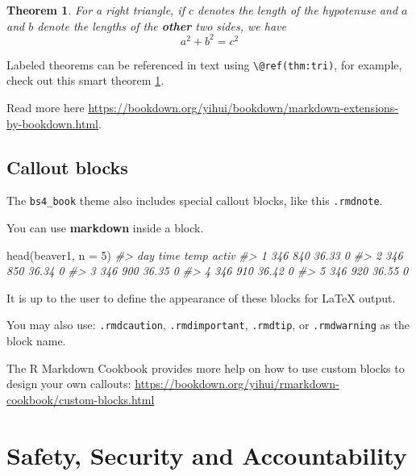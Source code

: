 \documentclass[
]{book}
\newenvironment{Shaded}{\begin{snugshade}}{\end{snugshade}}
\newcommand{\AttributeTok}[1]{\textcolor[rgb]{0.77,0.63,0.00}{#1}}
\newcommand{\CommentTok}[1]{\textcolor[rgb]{0.56,0.35,0.01}{\textit{#1}}}
\newcommand{\DecValTok}[1]{\textcolor[rgb]{0.00,0.00,0.81}{#1}}
\newcommand{\FunctionTok}[1]{\textcolor[rgb]{0.00,0.00,0.00}{#1}}
\newcommand{\NormalTok}[1]{#1}
\newtheorem{theorem}{Theorem}[chapter]
\theoremstyle{definition}
\theoremstyle{definition}
\theoremstyle{definition}
\theoremstyle{definition}
\theoremstyle{remark}
\begin{document}
\begin{theorem}
\protect\hypertarget{thm:tri}{}\label{thm:tri}For a right triangle, if \(c\) denotes the \emph{length} of the hypotenuse
and \(a\) and \(b\) denote the lengths of the \textbf{other} two sides, we have
\[a^2 + b^2 = c^2\]
\end{theorem}

Labeled theorems can be referenced in text using \texttt{\textbackslash{}@ref(thm:tri)}, for example, check out this smart theorem \ref{thm:tri}.

Read more here \url{https://bookdown.org/yihui/bookdown/markdown-extensions-by-bookdown.html}.

\hypertarget{callout-blocks}{%
\section{Callout blocks}\label{callout-blocks}}

The \texttt{bs4\_book} theme also includes special callout blocks, like this \texttt{.rmdnote}.

You can use \textbf{markdown} inside a block.

\begin{Shaded}
\begin{Highlighting}[]
\FunctionTok{head}\NormalTok{(beaver1, }\AttributeTok{n =} \DecValTok{5}\NormalTok{)}
\CommentTok{\#\textgreater{}   day time  temp activ}
\CommentTok{\#\textgreater{} 1 346  840 36.33     0}
\CommentTok{\#\textgreater{} 2 346  850 36.34     0}
\CommentTok{\#\textgreater{} 3 346  900 36.35     0}
\CommentTok{\#\textgreater{} 4 346  910 36.42     0}
\CommentTok{\#\textgreater{} 5 346  920 36.55     0}
\end{Highlighting}
\end{Shaded}

It is up to the user to define the appearance of these blocks for LaTeX output.

You may also use: \texttt{.rmdcaution}, \texttt{.rmdimportant}, \texttt{.rmdtip}, or \texttt{.rmdwarning} as the block name.

The R Markdown Cookbook provides more help on how to use custom blocks to design your own callouts: \url{https://bookdown.org/yihui/rmarkdown-cookbook/custom-blocks.html}

\hypertarget{ch-safety}{%
\chapter{Safety, Security and Accountability}\label{ch-safety}}
\end{document}
